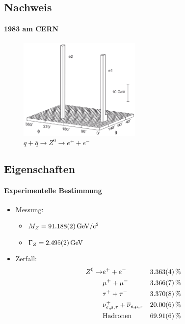 \subsection{Nachweis}
\begin{iframe}
	\framesubtitle{1983 am CERN}
	\begin{figure}
		\includegraphics[width=6cm]{img/lego}
		\caption*{$q+\overline{q} \rightarrow Z^0 \rightarrow e^+ + e^-$ \cite{povh}}
	\end{figure}
\end{iframe}


\subsection{Eigenschaften}
\begin{iframe}
	\framesubtitle{Experimentelle Bestimmung}
	\begin{itemize}
		\item Messung: %
		\begin{itemize}
			\item $M_Z = \SI{91.188+-0.002}{GeV/c^2}$
			\item $\Gamma_Z = \SI{2.495+-0.002}{GeV}$
		\end{itemize}
		\pause
		\item Zerfall:
		\begin{align*}
			Z^0 \rightarrow & e^+ + e^- & \SI{3.363+-0.004}{\%} \\
			& \mu^+ + \mu^- & \SI{3.366+-0.007}{\%} \\
			& \tau^+ + \tau^- & \SI{3.370+-0.008}{\%} \\
			& \nu_{e,\mu,\tau}^+ + \overline{\nu}_{e,\mu,\tau} & \SI{20+-0.06}{\%} \\
			& \text{Hadronen} & \SI{69.91+-0.06}{\%} \\
		\end{align*}
	\end{itemize}
\note[item]{}
\end{iframe}

